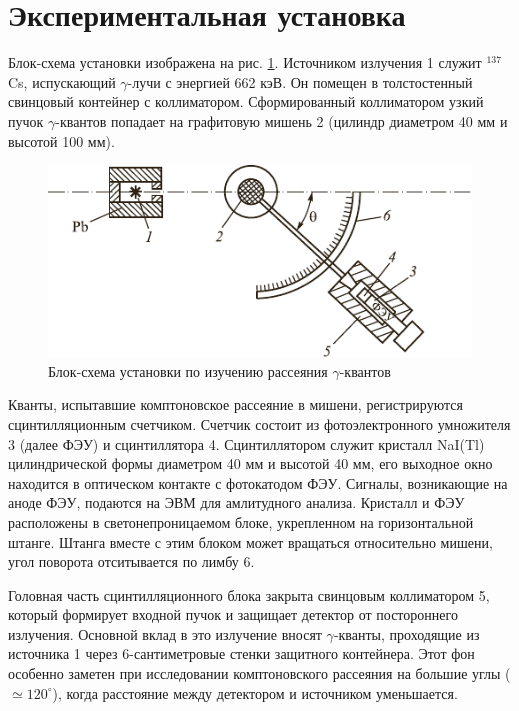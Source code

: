 \documentclass[a4paper, 12pt]{article}
\begin{document}
\section{Экспериментальная установка}
Блок-схема установки изображена на рис. \ref{scheme}. Источником излучения 1 служит $^{137}$Cs, испускающий $\gamma$-лучи с энергией 662 кэВ. Он помещен в толстостенный свинцовый контейнер с коллиматором. Сформированный коллиматором узкий пучок $\gamma$-квантов попадает на графитовую мишень 2 (цилиндр диаметром 40 мм и высотой 100 мм).
\begin{figure}[!htb]
	\centering
	\includegraphics[scale=1.2]{scheme.pdf}
	\caption{Блок-схема установки по изучению рассеяния $\gamma$-квантов}
	\label{scheme}
\end{figure}
\par
Кванты, испытавшие комптоновское рассеяние в мишени, регистрируются сцинтилляционным счетчиком. Счетчик состоит из фотоэлектронного умножителя 3 (далее ФЭУ) и сцинтиллятора 4. Сцинтиллятором служит кристалл NaI(Tl) цилиндрической формы диаметром 40 мм и высотой 40 мм, его выходное окно находится в оптическом контакте с фотокатодом ФЭУ. Сигналы, возникающие на аноде ФЭУ, подаются на ЭВМ для амлитудного анализа. Кристалл и ФЭУ расположены в светонепроницаемом блоке, укрепленном на горизонтальной штанге. Штанга вместе с этим блоком может вращаться относительно мишени, угол поворота отситывается по лимбу 6.\par
Головная часть сцинтилляционного блока закрыта свинцовым коллиматором 5, который формирует входной пучок и защищает детектор от постороннего излучения. Основной вклад в это излучение вносят $\gamma$-кванты, проходящие из источника 1 через 6-сантиметровые стенки защитного контейнера. Этот фон особенно заметен при исследовании комптоновского рассеяния на большие углы ($\simeq 120^\circ$), когда расстояние между детектором и источником уменьшается.
\end{document}
